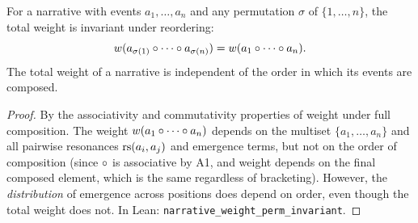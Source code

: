 
\begin{theorem}
\label{thm:narrative-temporal}
For a narrative with events $a_1, \ldots, a_n$ and any permutation $\sigma$ of $\{1, \ldots, n\}$, the total weight is invariant under reordering:
\[
  w(a_{\sigma(1)} \circ \cdots \circ a_{\sigma(n)}) = w(a_1 \circ \cdots \circ a_n).
\]
The total weight of a narrative is independent of the order in which its events are composed.
\end{theorem}

\begin{proof}
By the associativity and commutativity properties of weight under full composition.  The weight $w(a_1 \circ \cdots \circ a_n)$ depends on the multiset $\{a_1, \ldots, a_n\}$ and all pairwise resonances $\mathrm{rs}(a_i, a_j)$ and emergence terms, but not on the order of composition (since $\circ$ is associative by A1, and weight depends on the final composed element, which is the same regardless of bracketing).  However, the \emph{distribution} of emergence across positions does depend on order, even though the total weight does not.  In Lean: \texttt{narrative\_weight\_perm\_invariant}.
\end{proof}

